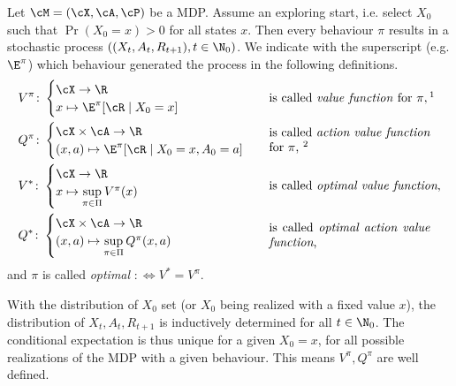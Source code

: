 \begin{definition} Let \(\cM=(\cX,\cA,\cP)\) be a MDP. Assume an exploring start, i.e. select \(X_0\) such that \(\Pr({X_0=x})>0\) for all states \(x\). Then every behaviour \(\pi\) results in a stochastic process \(((X_t,A_t,R_{t+1}), t\in \N_0)\).
We indicate with the superscript (e.g. \(\E^\pi\)) which behaviour generated the process in the following definitions.
\begin{align*}
	&V^\pi\colon
	\begin{cases}
		\cX\to\R\\
		x\mapsto \E^\pi[\cR\mid X_0=x]
	\end{cases} 
	&& \text{is called \emph{value function} for } \pi, \footnotemark[1]
	\\
	&Q^\pi\colon
	\begin{cases}
		\cX\times\cA\to\R\\
		(x,a)\mapsto \E^\pi[\cR\mid X_0=x, A_0=a]
	\end{cases}
	&& \parbox{13em}{is called \emph{action value function} for \(\pi\), \footnotemark[2]}
	\\
	&V^*\colon
	\begin{cases}
		\cX\to\R\\
		x\mapsto \sup\limits_{\pi\in\Pi} V^\pi(x)
	\end{cases} 
	&& \text{is called \emph{optimal value function},}
	\\
	&Q^*\colon
	\begin{cases}
		\cX\times\cA\to\R\\
		(x,a)\mapsto \sup\limits_{\pi\in\Pi} Q^\pi(x,a)
	\end{cases}
	&& \parbox{13em}{is called \emph{optimal action value function},}
\end{align*}
and \(\pi\) is called \emph{optimal} \(:\iff V^*=V^\pi\).
\end{definition}

\begin{remark}
With the distribution of \(X_0\) set (or \(X_0\) being realized with a fixed value \(x\)), the distribution of \(X_t, A_t,R_{t+1}\) is inductively determined for all \(t\in\N_0\). The conditional expectation is thus unique for a given \(X_0=x\), for all possible realizations of the MDP with a given behaviour.
This means \(V^\pi, Q^\pi\) are well defined.
\end{remark}

